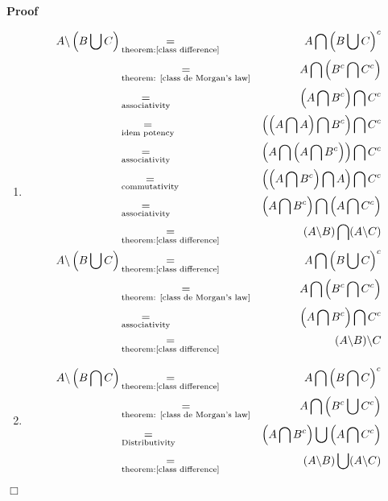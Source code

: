\documentclass{book}
\newcommand{\equallim}{\mathop{=}\limits}
\newenvironment{proof}{\noindent\textbf{Proof\ }}{\hspace*{\fill}$\Box$\medskip}
\begin{document}
\begin{proof}
  
  \begin{enumerate}
    \item 
    \begin{eqnarray*}
      A\backslash \left( B \bigcup C \right) &
      \equallim_{\text{theorem:\ref{class difference}}} & A \bigcap \left( B
      \bigcup C \right)^c\\
      & \equallim_{\text{theorem: \ref{class de Morgan's law}}} & A \bigcap
      \left( B^c \bigcap C^c \right)\\
      & \equallim_{\text{associativity}} & \left( A \bigcap B^c \right)
      \bigcap C^c\\
      & \equallim_{\text{idem potency}} & \left( \left( A \bigcap A \right)
      \bigcap B^c \right) \bigcap C^c\\
      & \equallim_{\text{associativity}} & \left( A \bigcap \left( A \bigcap
      B^c \right) \right) \bigcap C^c\\
      & \equallim_{\text{commutativity}} & \left( \left( A \bigcap B^c
      \right) \bigcap A \right) \bigcap C^c\\
      & \equallim_{\text{associativity}} & \left( A \bigcap B^c \right)
      \bigcap \left( A \bigcap C^c \right)\\
      & \equallim_{\text{theorem:\ref{class difference}}} & (A\backslash B)
      \bigcap (A\backslash C)\\
      A\backslash \left( B \bigcup C \right) &
      \equallim_{\text{theorem:\ref{class difference}}} & A \bigcap \left( B
      \bigcup C \right)^c\\
      & \equallim_{\text{theorem: \ref{class de Morgan's law}}} & A \bigcap
      \left( B^c \bigcap C^c \right)\\
      & \equallim_{\text{associativity}} & \left( A \bigcap B^c \right)
      \bigcap C^c\\
      & \equallim_{\text{theorem:\ref{class difference}}} & (A\backslash B)
      \backslash C
    \end{eqnarray*}
    \item
    \begin{eqnarray*}
      A\backslash \left( B \bigcap C \right) &
      \equallim_{\text{theorem:\ref{class difference}}} & A \bigcap \left( B
      \bigcap C \right)^c\\
      & \equallim_{\text{theorem: \ref{class de Morgan's law}}} & A \bigcap
      \left( B^c \bigcup C^c \right)\\
      & \equallim_{\text{Distributivity}} &  \left( A \bigcap B^c \right)
      \bigcup \left( A \bigcap C^c \right)\\
      & \equallim_{\text{theorem:\ref{class difference}}} & (A\backslash B)
      \bigcup (A\backslash C)
    \end{eqnarray*}
  \end{enumerate}
\end{proof}
\end{document}
